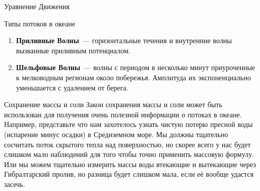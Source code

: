 \begin{chapter}{Уравнение Движения}
\begin{section}{Типы потоков в океане}
\begin{enumerate}
\item
\textbf{Приливные Волны}~--- горизонтальные течения и внутренние волны
вызванные приливным потенциалом.
%

\item
\textbf{Шельфовые Волны}~--- волны с периодом в несколько минут
приуроченные к мелководным регионам около побережья. Амплитуда их
экспоненциально уменьшается с удалением от берега.
%
\end{enumerate}
\end{section}

\begin{section}{Сохранение массы и соли}
Закон сохранения массы и соли может быть использован для получения
очень полезной информации о потоках в океане. Например, представьте
что нам захотелось узнать чистую потерю пресной воды (испарение минус
осадки) в Средиземном море. Мы должны тщательно сосчитать поток
скрытого тепла над поверхностью, но скорее всего у нас будет слишком
мало наблюдений для того чтобы точно применить массовую формулу. Или
мы можем тщательно измерить массы воды втекающие и вытекающие через
Гибралтарский пролив, но разница будет слишком мала, если её вообще
удастся засечь.
%


\end{section}
\end{chapter}

